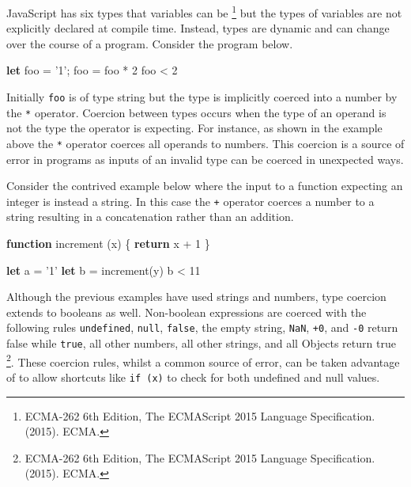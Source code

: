 \documentclass[]{article}
\newenvironment{Shaded}{}{}
\newcommand{\AttributeTok}[1]{\textcolor[rgb]{0.49,0.56,0.16}{#1}}
\newcommand{\ControlFlowTok}[1]{\textcolor[rgb]{0.00,0.44,0.13}{\textbf{#1}}}
\newcommand{\DecValTok}[1]{\textcolor[rgb]{0.25,0.63,0.44}{#1}}
\newcommand{\KeywordTok}[1]{\textcolor[rgb]{0.00,0.44,0.13}{\textbf{#1}}}
\newcommand{\NormalTok}[1]{#1}
\newcommand{\OperatorTok}[1]{\textcolor[rgb]{0.40,0.40,0.40}{#1}}
\newcommand{\StringTok}[1]{\textcolor[rgb]{0.25,0.44,0.63}{#1}}
\begin{document}
JavaScript has six types that variables can be \footnote{ECMA-262 6th
  Edition, The ECMAScript 2015 Language Specification. (2015). ECMA.}
but the types of variables are not explicitly declared at compile time.
Instead, types are dynamic and can change over the course of a program.
Consider the program below.

\begin{Shaded}
\begin{Highlighting}[]
\KeywordTok{let}\NormalTok{ foo }\OperatorTok{=} \StringTok{'1'}\OperatorTok{;}
\NormalTok{foo }\OperatorTok{=}\NormalTok{ foo }\OperatorTok{*} \DecValTok{2}
\NormalTok{foo}
\OperatorTok{<} \DecValTok{2}
\end{Highlighting}
\end{Shaded}

Initially \texttt{foo} is of type string but the type is implicitly
coerced into a number by the \texttt{*} operator. Coercion between types
occurs when the type of an operand is not the type the operator is
expecting. For instance, as shown in the example above the \texttt{*}
operator coerces all operands to numbers. This coercion is a source of
error in programs as inputs of an invalid type can be coerced in
unexpected ways.

Consider the contrived example below where the input to a function
expecting an integer is instead a string. In this case the \texttt{+}
operator coerces a number to a string resulting in a concatenation
rather than an addition.

\begin{Shaded}
\begin{Highlighting}[]
\KeywordTok{function} \AttributeTok{increment}\NormalTok{ (x) }\OperatorTok{\{}
  \ControlFlowTok{return}\NormalTok{ x }\OperatorTok{+} \DecValTok{1}
\OperatorTok{\}}

\KeywordTok{let}\NormalTok{ a }\OperatorTok{=} \StringTok{'1'}
\KeywordTok{let}\NormalTok{ b }\OperatorTok{=} \AttributeTok{increment}\NormalTok{(y)}
\NormalTok{b}
\OperatorTok{<} \DecValTok{11}
\end{Highlighting}
\end{Shaded}

Although the previous examples have used strings and numbers, type
coercion extends to booleans as well. Non-boolean expressions are
coerced with the following rules \texttt{undefined}, \texttt{null},
\texttt{false}, the empty string, \texttt{NaN}, \texttt{+0}, and
\texttt{-0} return false while \texttt{true}, all other numbers, all
other strings, and all Objects return true \footnote{ECMA-262 6th
  Edition, The ECMAScript 2015 Language Specification. (2015). ECMA.}.
These coercion rules, whilst a common source of error, can be taken
advantage of to allow shortcuts like \texttt{if\ (x)} to check for both
undefined and null values.
\end{document}
